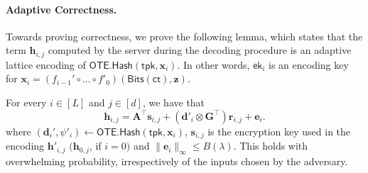 \documentclass{article}
\newcommand{\ek}{\mathsf{ek}}
\newcommand{\OTE}{\mathsf{OTE}}
\renewcommand{\sec}{\ensuremath{\lambda}}
\newcommand{\ct}{\mathsf{ct}}
\newcommand{\algofont}[1]{\ensuremath{\mathsf{#1}}}
\newcommand{\tpk}{{\algofont{tpk}}}
\newcommand{\Hash}{{\algofont{Hash}}}
\begin{document}
    \paragraph{Adaptive Correctness.} Towards proving correctness, we prove the following lemma, which states that the term $\mathbf{h}_{i, j}$ computed by the server during the decoding procedure is an adaptive lattice encoding of $\OTE.\Hash(\tpk, \mathbf{x}_i)$. In other words, $\ek_i$ is an encoding key for $\mathbf{x}_i=(f_{i-1}'\circ\dots\circ f'_0)(\mathsf{Bits}(\ct), \mathbf{z})$.
\begin{lemma}
\label{claimboh}
For every $i\in[L]$ and $j\in[d]$, we have that
\[ \mathbf{h}_{i,j}=\mathbf{A}^\intercal \mathbf{s}_{i,j}+(\mathbf{d}'_i\otimes \mathbf{G}^\intercal)\mathbf{r}_{i,j}+\mathbf e_i. \]
where $(\mathbf{d}_i', \psi'_i)\gets\OTE.\Hash(\tpk, \mathbf{x}_i)$, $\mathbf{s}_{i, j}$ is the encryption key used in the encoding $\mathbf{h}'_{i, j}$ $(\mathbf{h}_{0, j}$, if $i=0)$ and $\lVert \mathbf{e}_i\rVert_\infty\le B(\sec)$. {This holds with overwhelming probability, irrespectively of the inputs chosen by the adversary.}
\end{lemma}
\end{document}
